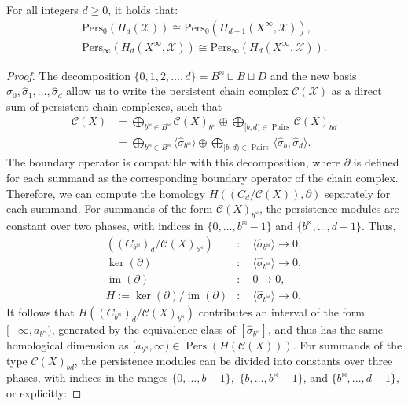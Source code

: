 \begin{theorem}{\cite[Proposition 2.4]{de2011dualities}}
	For all integers $d \geq 0$, it holds that:
	\begin{align*}
		\mathrm{Pers}_0(H_{d}(\mathcal{X})) \cong \mathrm{Pers}_0(H_{d+1}(X^\infty, \mathcal{X})), \nonumber\\
		\mathrm{Pers}_\infty(H_{d}(X^{\infty}, \mathcal{X})) \cong \mathrm{Pers}_\infty(H_{d}(X^{\infty}, \mathcal{X})).
	\end{align*}
\end{theorem}

\begin{proof}{\textit{\cite[Proof of Proposition 2.4]{de2011dualities}}}
The decomposition $\{0,1,2,\ldots,d\} = B^\Join \sqcup B \sqcup D$ and the new basis $\hat{\sigma}_0, \hat{\sigma}_1, \ldots, \hat{\sigma}_d$ allow us to write the persistent chain complex $\mathcal{C}(\mathcal{X})$ as a direct sum of persistent chain complexes, such that
\begin{align}
	\mathcal{C}(X) &= \bigoplus_{b^\Join \in B^\Join} \mathcal{C}(X)_{b^\Join} \oplus \bigoplus_{[b,d) \in \operatorname{Pairs}} \mathcal{C}(X)_{bd} \nonumber\\
	&= \bigoplus_{b^\Join \in B^\Join} \langle \hat{\sigma}_{b^\Join} \rangle \oplus \bigoplus_{[b,d) \in \operatorname{Pairs}} \langle \hat{\sigma}_{b}, \hat{\sigma}_{d} \rangle.
\end{align}
The boundary operator is compatible with this decomposition, where $\partial$ is defined for each summand as the corresponding boundary operator of the chain complex. Therefore, we can compute the homology $H((C_d/\mathcal{C}(X)),\partial)$ separately for each summand. For summands of the form $\mathcal{C}(X)_{b^\Join}$, the persistence modules are constant over two phases, with indices in $\{0,\ldots,b^\Join - 1\}$ and $\{b^\Join, \ldots, d-1\}$. Thus,
\begin{align}
	((C_{b^{\Join}})_d/\mathcal{C}(X)_{b^\Join})&: \quad \langle \hat{\sigma}_{b^\Join}\rangle \rightarrow 0,\nonumber\\
	\ker(\partial)&: \quad \langle \hat{\sigma}_{b^\Join}\rangle \rightarrow 0,\nonumber\\
	\operatorname{im}(\partial)&: \quad 0 \rightarrow 0,\nonumber\\
	H := \ker(\partial) / \operatorname{im}(\partial)&: \quad \langle \hat{\sigma}_{b^\Join}\rangle \rightarrow 0.
\end{align}
It follows that $H((C_{b^\Join})_d/\mathcal{C}(X)_{b^\Join})$ contributes an interval of the form $[-\infty, a_{b^\Join})$, generated by the equivalence class of $[\hat{\sigma}_{b^\Join}]$, and thus has the same homological dimension as $[a_{b^{\Join}}, \infty) \in \operatorname{Pers}(H(\mathcal{C}(X)))$. For summands of the type $\mathcal{C}(X)_{bd}$, the persistence modules can be divided into constants over three phases, with indices in the ranges $\{0,\ldots,b-1\},$ $\{b,\ldots,b^{\Join}-1\}$, and $\{b^\Join,\ldots, d-1\}$, or explicitly:

\end{proof}
